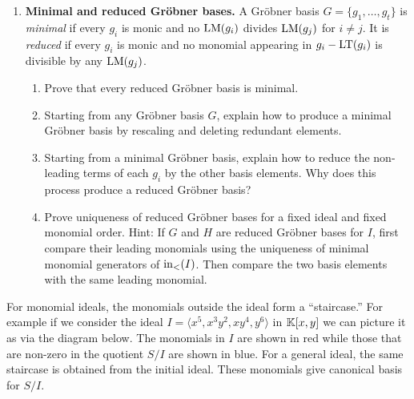 \documentclass[Notebook.tex]{subfiles}
\begin{document}
\begin{enumerate}[leftmargin=*, series=problems]
\begin{enumerate}[label=(\alph*),ref=\theenumi\alph*]
    \item Prove that if $G$ is a Gr\"obner basis for $I$, then the remainder of $f$ on division by $G$ is independent of all choices made during the division algorithm. Hint: If two remainders $r$ and $r'$ occur, compare $r-r'$.
    
    \item Let $I=\langle xy-1,y^2-1\rangle\subset\K[x,y]$ with lex order $x>y$. Divide $x-y$ by the ordered list $(xy-1,y^2-1)$. Explain why the answer is consistent with part (b).
\end{enumerate}

\item \textbf{Minimal and reduced Gr\"obner bases.} A Gr\"obner basis $G=\{g_1,\ldots,g_t\}$ is \emph{minimal} if every $g_i$ is monic and no $\text{LM}(g_i)$ divides $\text{LM}(g_j)$ for $i\neq j$. It is \emph{reduced} if every $g_i$ is monic and no monomial appearing in $g_i-\text{LT}(g_i)$ is divisible by any $\text{LM}(g_j)$.
\begin{enumerate}[label=(\alph*),ref=\theenumi\alph*]
    \item Prove that every reduced Gr\"obner basis is minimal.
    
    \item Starting from any Gr\"obner basis $G$, explain how to produce a minimal Gr\"obner basis by rescaling and deleting redundant elements.
    
    \item Starting from a minimal Gr\"obner basis, explain how to reduce the non-leading terms of each $g_i$ by the other basis elements. Why does this process produce a reduced Gr\"obner basis?
    
    \item Prove uniqueness of reduced Gr\"obner bases for a fixed ideal and fixed monomial order. Hint: If $G$ and $H$ are reduced Gr\"obner bases for $I$, first compare their leading monomials using the uniqueness of minimal monomial generators of $\text{in}_<(I)$. Then compare the two basis elements with the same leading monomial.
\end{enumerate}

\end{enumerate}

\hrulefill

For monomial ideals, the monomials outside the ideal form a ``staircase.'' For example if we consider the ideal $I=\langle x^5, x^{3}y^{2}, xy^{4}, y^{6}\rangle$ in $\mathbb K[x,y]$ we can picture it as via the diagram below. The monomials in $I$ are shown in red while those that are non-zero in the quotient $S/I$ are shown in blue.
For a general ideal, the same staircase is obtained from the initial ideal. These monomials give canonical basis for $S/I$.
\end{document}
